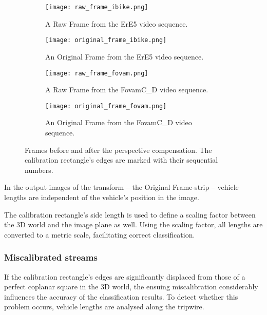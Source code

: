 \begin{figure}[!t]
	\centering
		\begin{subfigure}[b]{0.36\textwidth}
			\texttt{[image: raw\_frame\_ibike.png]}
			\caption{A Raw Frame from the ErE5 video sequence.}
		\end{subfigure}
		\quad
		\begin{subfigure}[b]{0.36\textwidth}
			\texttt{[image: original\_frame\_ibike.png]}
			\caption{An Original Frame from the ErE5 video sequence.}
		\end{subfigure}
		\hfill
		\begin{subfigure}[b]{0.36\textwidth}
			\texttt{[image: raw\_frame\_fovam.png]}
			\caption{A Raw Frame from the FovamC\_D video sequence.}
		\end{subfigure}
		\quad
		\begin{subfigure}[b]{0.36\textwidth}
			\texttt{[image: original\_frame\_fovam.png]}
			\caption{An Original Frame from the FovamC\_D video sequence.}
		\end{subfigure}
		
		\caption{Frames before and after the perspective compensation. The calibration rectangle's edges are marked with their sequential numbers.\label{fig:perscomp}}
\end{figure}

In the output images of the transform -- the Original Frame-strip --  vehicle lengths are independent of the vehicle's position in the image. 

The calibration rectangle's side length is used to define a scaling factor between the 3D world and the image plane as well.
Using the scaling factor, all lengths are converted to a metric scale, facilitating correct classification.

\subsubsection{Miscalibrated streams}
If the calibration rectangle's edges are significantly displaced from those of a perfect coplanar square in the 3D world, the ensuing miscalibration considerably influences the accuracy of the classification results.
To detect whether this problem occurs, vehicle lengths are analysed along the tripwire.

